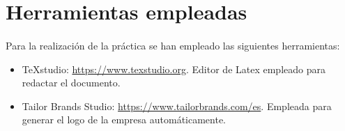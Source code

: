 \section{Herramientas empleadas}

	\paragraph{}Para la realización de la práctica se han empleado las siguientes herramientas:
	
	\begin{itemize}
		\item TeXstudio: \url{https://www.texstudio.org}. Editor de Latex empleado para redactar el documento.
		
		\item Tailor Brands Studio: \url{https://www.tailorbrands.com/es}. Empleada para generar el logo de la empresa automáticamente.
		
	\end{itemize}
